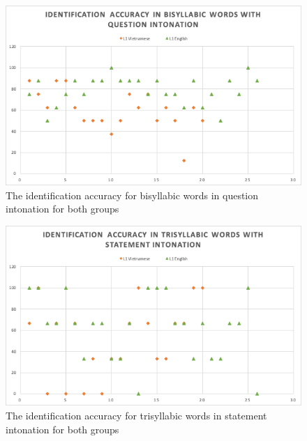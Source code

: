 \documentclass[a4paper]{article}
\begin{document}
\begin{figure}[H]
\begin{center}  
\includegraphics[scale=0.7]{identification-accuracy-question.png} 
\caption{The identification accuracy for bisyllabic words in question intonation for both groups}
\label{fig:icq}
\end{center}   
\end{figure}

\begin{figure}[H]
\begin{center}  
\includegraphics[scale=0.7]{identification-accuracy-tri-statement.png} 
\caption{The identification accuracy for trisyllabic words in statement intonation for both groups}
\label{fig:ics3}
\end{center}   
\end{figure}
\end{document}
